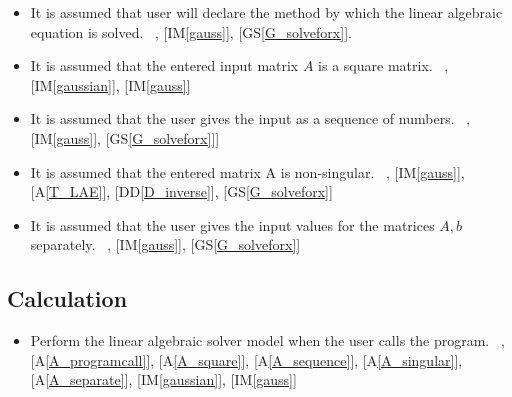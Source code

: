 \documentclass[12pt]{article}
\newcommand{\ddref}[1]{DD\ref{#1}}
\newcommand{\tref}[1]{T\ref{#1}}
\newcounter{assumpnum} %
\newcommand{\aref}[1]{A\ref{#1}}
\newcommand{\gsref}[1]{GS\ref{#1}}
\newcommand{\iref}[1]{IM\ref{#1}}
\newcounter{lcnum} %
\newcounter{calcnum} %
\begin{document}
\begin{itemize}

\item[A\refstepcounter{assumpnum}\theassumpnum \label{A_programcall}:]
It is assumed that user will declare the method by which the linear algebraic equation is solved.
~\newline
 [\iref{gaussian}], [\iref{gauss}], [\gsref{G_solveforx}].

\item[A\refstepcounter{assumpnum}\theassumpnum \label{A_square}:]
It is assumed that the entered input matrix $A$ is a square matrix.
~\newline
 [\tref{T_LAE}], [\iref{gaussian}], [\iref{gauss}]

\item[A\refstepcounter{assumpnum}\theassumpnum \label{A_sequence}:]
It is assumed that the user gives the input as a sequence of numbers.
~\newline
 [\iref{gaussian}], [\iref{gauss}], [\gsref{G_solveforx}]]

\item[A\refstepcounter{assumpnum}\theassumpnum \label{A_singular}:]
It is assumed that the entered matrix A is non-singular. 
~\newline
[\iref{gaussian}], [\iref{gauss}], [\aref{T_LAE}], [\ddref{D_inverse}], [\gsref{G_solveforx}]

\item[A\refstepcounter{assumpnum}\theassumpnum \label{A_separate}:]
It is assumed that the user gives the input values for the matrices $A, b$ separately.
~\newline
 [\iref{gaussian}], [\iref{gauss}], [\gsref{G_solveforx}]


\end{itemize}

\subsection{Calculation} \label{sec_Calculation}    

\begin{itemize}

\item[C\refstepcounter{calcnum}\thecalcnum \label{C_progname}:]
Perform the linear algebraic solver model when the user calls the program.
~\newline
[\gsref{G_solveforx}], [\aref{A_programcall}], [\aref{A_square}],
[\aref{A_sequence}], [\aref{A_singular}], [\aref{A_separate}], [\iref{gaussian}], [\iref{gauss}]

\end{itemize}
\end{document}
